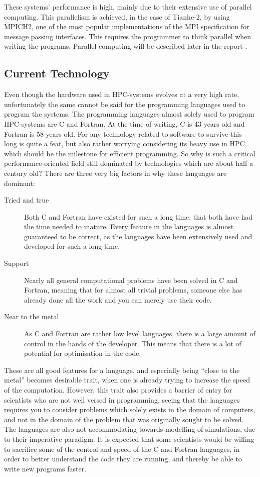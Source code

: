 These systems' performance is high, mainly due to their extensive use of parallel computing. This parallelism is achieved, in the case of Tianhe-2, by using MPICH2, one of the most popular implementations of the MPI specification for message passing interfaces. This requires the programmer to think parallel when writing the programs. Parallel computing will be described later in the report .


\subsection{Current Technology}

Even though the hardware used in HPC-systems evolves at a very high rate, unfortunately the same cannot be said for the programming languages used to program the systems. The programming languages almost solely used to program HPC-systems are C and Fortran. At the time of writing, C is 43 years old and Fortran is 58 years old. For any technology related to software to survive this long is quite a feat, but also rather worrying considering its heavy use in HPC, which should be the milestone for efficient programming.
So why is such a critical performance-oriented field still dominated by technologies which are about half a century old? There are three very big factors in why these languages are dominant:

\begin{description}
	\item [Tried and true]
	Both C and Fortran have existed for such a long time, that both have had the time needed to mature. Every feature in the languages is almost guaranteed to be correct, as the languages have been extensively used and developed for such a long time.
	\item [Support]
	Nearly all general computational problems have been solved in C and Fortran, meaning that for almost all trivial problems, someone else has already done all the work and you can merely use their code.
	\item [Near to the metal]
	As C and Fortran are rather low level languages, there is a large amount of control in the hands of the developer. This means that there is a lot of potential for optimisation in the code.
\end{description}

These are all good features for a language, and especially being \enquote{close to the metal} becomes desirable trait, when one is already trying to increase the speed of the computation. However, this trait also provides a barrier of entry for scientists who are not well versed in programming, seeing that the languages requires you to consider problems which solely exists in the domain of computers, and not in the domain of the problem that was originally sought to be solved. The languages are also not accommodating towards modelling of simulations, due to their imperative paradigm. It is expected that some scientists would be willing to sacrifice some of the control and speed of the C and Fortran languages, in order to better understand the code they are running, and thereby be able to write new programs faster.